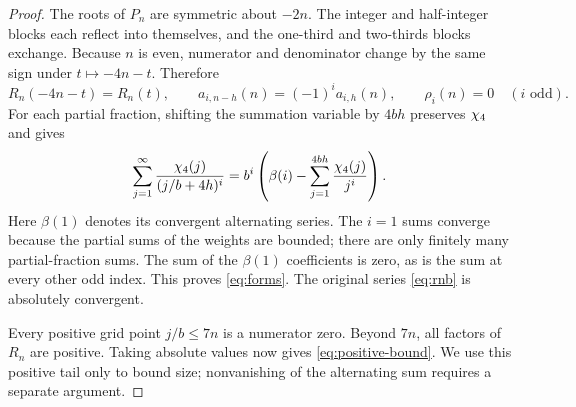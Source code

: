 \begin{proof}
The roots of $P_n$ are symmetric about $-2n$. The integer and half-integer
blocks each reflect into themselves, and the one-third and two-thirds
blocks exchange. Because $n$ is even, numerator and denominator change
by the same sign under $t\mapsto-4n-t$. Therefore
\[
 R_n(-4n-t)=R_n(t),\qquad
 a_{i,n-h}(n)=(-1)^i a_{i,h}(n),\qquad \rho_i(n)=0\quad(i\text{ odd}).
\]
For each partial fraction, shifting the summation variable by $4bh$
preserves $\chi_4$ and gives
\[
 \sum_{j=1}^{\infty}\frac{\chi_4(j)}{(j/b+4h)^i}
 =b^i\left(\beta(i)-\sum_{j=1}^{4bh}\frac{\chi_4(j)}{j^i}\right).
\]
Here $\beta(1)$ denotes its convergent alternating series. The $i=1$
sums converge because the partial sums of the weights are bounded;
there are only finitely many partial-fraction sums. The sum of the
$\beta(1)$ coefficients is zero, as is the sum at every other odd index.
This proves \eqref{eq:forms}.
The original series \eqref{eq:rnb} is absolutely convergent.

Every positive grid point $j/b\leq7n$ is a numerator zero. Beyond $7n$,
all factors of $R_n$ are positive. Taking absolute values now gives
\eqref{eq:positive-bound}. We use this positive tail only to bound size;
nonvanishing of the alternating sum requires a separate argument.
\end{proof}
